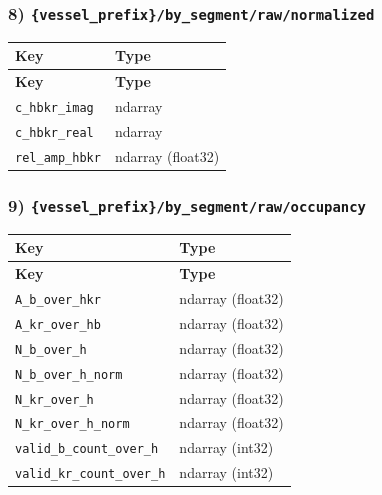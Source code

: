 \documentclass[11pt]{article}
\begin{document}
\subsubsection*{8) \texttt{\{vessel\_\allowbreak{}prefix\}/\allowbreak{}by\_\allowbreak{}segment/\allowbreak{}raw/\allowbreak{}normalized}}
\begin{longtable}{|p{}|p{}|}
\hline
\textbf{Key} & \textbf{Type} \\ \hline
\endfirsthead
\hline
\textbf{Key} & \textbf{Type} \\ \hline
\endhead
\texttt{c\_\allowbreak{}hbkr\_\allowbreak{}imag} & ndarray \\ \hline
\texttt{c\_\allowbreak{}hbkr\_\allowbreak{}real} & ndarray \\ \hline
\texttt{rel\_\allowbreak{}amp\_\allowbreak{}hbkr} & ndarray (float32) \\ \hline
\end{longtable}

\subsubsection*{9) \texttt{\{vessel\_\allowbreak{}prefix\}/\allowbreak{}by\_\allowbreak{}segment/\allowbreak{}raw/\allowbreak{}occupancy}}
\begin{longtable}{|p{}|p{}|}
\hline
\textbf{Key} & \textbf{Type} \\ \hline
\endfirsthead
\hline
\textbf{Key} & \textbf{Type} \\ \hline
\endhead
\texttt{A\_\allowbreak{}b\_\allowbreak{}over\_\allowbreak{}hkr} & ndarray (float32) \\ \hline
\texttt{A\_\allowbreak{}kr\_\allowbreak{}over\_\allowbreak{}hb} & ndarray (float32) \\ \hline
\texttt{N\_\allowbreak{}b\_\allowbreak{}over\_\allowbreak{}h} & ndarray (float32) \\ \hline
\texttt{N\_\allowbreak{}b\_\allowbreak{}over\_\allowbreak{}h\_\allowbreak{}norm} & ndarray (float32) \\ \hline
\texttt{N\_\allowbreak{}kr\_\allowbreak{}over\_\allowbreak{}h} & ndarray (float32) \\ \hline
\texttt{N\_\allowbreak{}kr\_\allowbreak{}over\_\allowbreak{}h\_\allowbreak{}norm} & ndarray (float32) \\ \hline
\texttt{valid\_\allowbreak{}b\_\allowbreak{}count\_\allowbreak{}over\_\allowbreak{}h} & ndarray (int32) \\ \hline
\texttt{valid\_\allowbreak{}kr\_\allowbreak{}count\_\allowbreak{}over\_\allowbreak{}h} & ndarray (int32) \\ \hline
\end{longtable}
\end{document}
